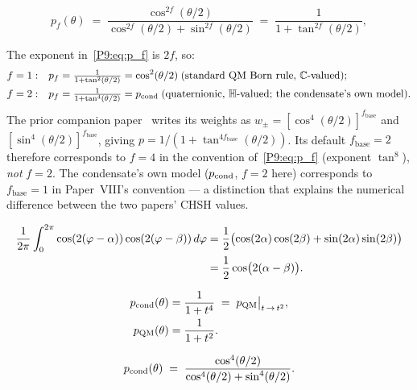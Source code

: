 \begin{equation}
  p_f(\theta)
  \;=\; \frac{\cos^{2f}(\theta/2)}{\cos^{2f}(\theta/2)+\sin^{2f}(\theta/2)}
  \;=\; \frac{1}{1+\tan^{2f}(\theta/2)},
  \label{P9:eq:p_f}
\end{equation}

\begin{remark}
\label{P9:rem:f_convention}
The exponent in~\eqref{P9:eq:p_f} is $2f$, so:
\begin{align*}
  f=1:&\quad p_f = \tfrac{1}{1+\tan^2(\theta/2)} = \cos^2(\theta/2)
         \;\text{(standard QM Born rule, $\mathbb{C}$-valued);}\\
  f=2:&\quad p_f = \tfrac{1}{1+\tan^4(\theta/2)} = p_{\mathrm{cond}}
         \;\text{(quaternionic, $\mathbb{H}$-valued; the condensate's own model).}
\end{align*}
The prior companion paper~\cite{Paper8} writes its weights as
$w_\pm = [\cos^4(\theta/2)]^{f_\mathrm{base}}$ and $[\sin^4(\theta/2)]^{f_\mathrm{base}}$,
giving $p = 1/(1+\tan^{4f_\mathrm{base}}(\theta/2))$.
Its default $f_\mathrm{base}=2$ therefore corresponds to $f=4$ in
the convention of~\eqref{P9:eq:p_f} (exponent $\tan^8$), \emph{not} $f=2$.
The condensate's own model ($p_{\mathrm{cond}}$, $f=2$ here) corresponds to
$f_\mathrm{base}=1$ in Paper~VIII's convention --- a distinction that
explains the numerical difference between the two papers' CHSH values.
\end{remark}

\begin{align}
  \frac{1}{2\pi}\int_0^{2\pi}\cos(2(\varphi-\alpha))\cos(2(\varphi-\beta))\,d\varphi
  &= \frac{1}{2}\bigl(\cos(2\alpha)\cos(2\beta)+\sin(2\alpha)\sin(2\beta)\bigr) \notag\\
  &= \frac{1}{2}\cos\bigl(2(\alpha-\beta)\bigr).
  \label{P9:eq:parseval_m2}
\end{align}

\begin{align}
  p_{\mathrm{cond}}(\theta) &= \frac{1}{1+t^4}
  \;=\; p_{\mathrm{QM}}\bigl|_{t\,\to\, t^2}, \label{P9:eq:pcond_as_pQM}\\
  p_{\mathrm{QM}}(\theta)   &= \frac{1}{1+t^2}. \label{P9:eq:pQM_tan}
\end{align}

\begin{equation}
  p_{\mathrm{cond}}(\theta)
  \;=\; \frac{\cos^4(\theta/2)}{\cos^4(\theta/2)+\sin^4(\theta/2)}.
  \label{P9:eq:pcond_def}
\end{equation}

